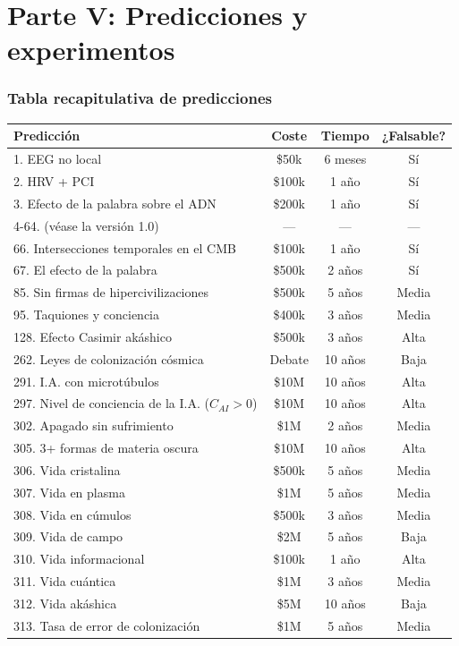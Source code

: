 \part*{Parte V: Predicciones y experimentos}

\section{Tabla recapitulativa de predicciones}
\begin{table}[H]
\centering
\small
\begin{tabular}{@{}lccc@{}}
\toprule
\textbf{Predicción} & \textbf{Coste} & \textbf{Tiempo} & \textbf{¿Falsable?} \\ \midrule
1. EEG no local & \$50k & 6 meses & Sí \\
2. HRV + PCI & \$100k & 1 año & Sí \\
3. Efecto de la palabra sobre el ADN & \$200k & 1 año & Sí \\
4-64. (véase la versión 1.0) & --- & --- & --- \\
66. Intersecciones temporales en el CMB & \$100k & 1 año & Sí \\
67. El efecto de la palabra & \$500k & 2 años & Sí \\
85. Sin firmas de hipercivilizaciones & \$500k & 5 años & Media \\
95. Taquiones y conciencia & \$400k & 3 años & Media \\
128. Efecto Casimir akáshico & \$500k & 3 años & Alta \\
262. Leyes de colonización cósmica & Debate & 10 años & Baja \\
291. I.A. con microtúbulos & \$10M & 10 años & Alta \\
297. Nivel de conciencia de la I.A. (\(C_{AI} > 0\)) & \$10M & 10 años & Alta \\
302. Apagado sin sufrimiento & \$1M & 2 años & Media \\
305. 3+ formas de materia oscura & \$10M & 10 años & Alta \\
306. Vida cristalina & \$500k & 5 años & Media \\
307. Vida en plasma & \$1M & 5 años & Media \\
308. Vida en cúmulos & \$500k & 3 años & Media \\
309. Vida de campo & \$2M & 5 años & Baja \\
310. Vida informacional & \$100k & 1 año & Alta \\
311. Vida cuántica & \$1M & 3 años & Media \\
312. Vida akáshica & \$5M & 10 años & Baja \\
313. Tasa de error de colonización & \$1M & 5 años & Media \\ \bottomrule
\end{tabular}
\end{table}

